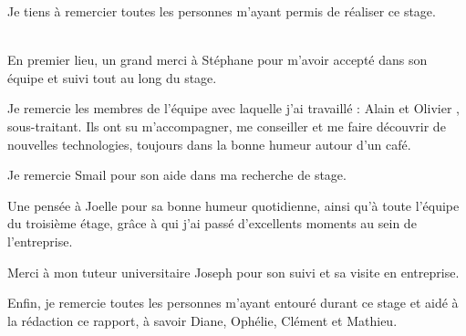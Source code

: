 Je tiens à remercier toutes les personnes m'ayant permis de réaliser ce stage.\\~

En premier lieu, un grand merci à Stéphane  pour m'avoir accepté dans son équipe et suivi tout au long du stage.

Je remercie les membres de l'équipe avec laquelle j'ai travaillé : Alain  et Olivier , sous-traitant. Ils ont su m'accompagner, me conseiller et me faire découvrir de nouvelles technologies, toujours dans la bonne humeur autour d'un café.

Je remercie Smail  pour son aide dans ma recherche de stage. 

Une pensée à Joelle  pour sa bonne humeur quotidienne, ainsi qu'à toute l'équipe du troisième étage, grâce à qui j'ai passé d'excellents moments au sein de l'entreprise.

Merci à mon tuteur universitaire Joseph  pour son suivi et sa visite en entreprise.

Enfin, je remercie toutes les personnes m'ayant entouré durant ce stage et aidé à la rédaction ce rapport, à savoir Diane, Ophélie, Clément et Mathieu.
